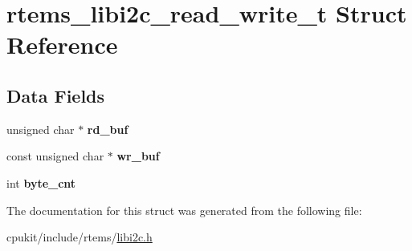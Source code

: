 \hypertarget{structrtems__libi2c__read__write__t}{}\section{rtems\+\_\+libi2c\+\_\+read\+\_\+write\+\_\+t Struct Reference}
\label{structrtems__libi2c__read__write__t}
\subsection*{Data Fields}
\begin{DoxyCompactItemize}
\item 
\mbox{\label{structrtems__libi2c__read__write__t_aa41f2b003dc4e58db30997f5c5e22eac}} 
unsigned char $\ast$ {\bfseries rd\+\_\+buf}
\item 
\mbox{\label{structrtems__libi2c__read__write__t_a52521b13a172b4d21d88fd546dd137b5}} 
const unsigned char $\ast$ {\bfseries wr\+\_\+buf}
\item 
\mbox{\label{structrtems__libi2c__read__write__t_a6ba042830ecac4e10d14534f5500fbc9}} 
int {\bfseries byte\+\_\+cnt}
\end{DoxyCompactItemize}


The documentation for this struct was generated from the following file\+:\begin{DoxyCompactItemize}
\item 
cpukit/include/rtems/\mbox{\hyperlink{libi2c_8h}{libi2c.\+h}}\end{DoxyCompactItemize}
